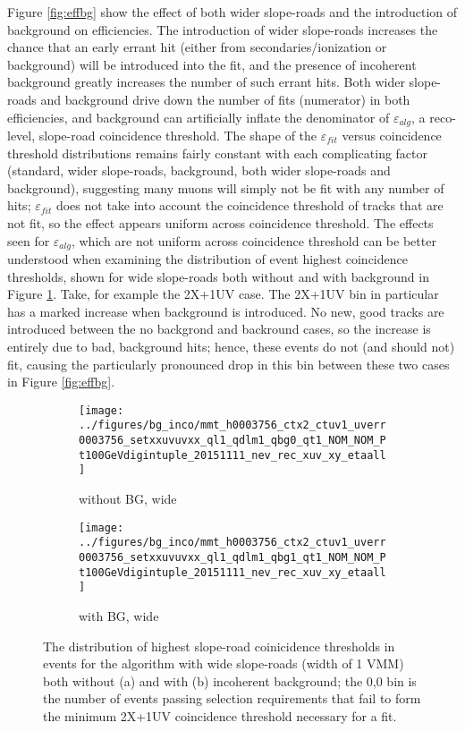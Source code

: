 Figure \ref{fig:effbg} show the effect of both wider slope-roads and the introduction of background on efficiencies.  The introduction of wider slope-roads increases the chance that an early errant hit (either from secondaries/ionization or background) will be introduced into the fit, and the presence of incoherent background greatly increases the number of such errant hits.  Both wider slope-roads and background drive down the number of fits (numerator) in both efficiencies, and background can artificially inflate the denominator of $\varepsilon_{alg}$, a reco-level, slope-road coincidence threshold.  The shape of the $\varepsilon_{fit}$ versus coincidence threshold distributions remains fairly constant with each complicating factor (standard, wider slope-roads, background, both wider slope-roads and background), suggesting many muons will simply not be fit with any number of hits; $\varepsilon_{fit}$ does not take into account the coincidence threshold of tracks that are not fit, so the effect appears uniform across coincidence threshold.  The effects seen for $\varepsilon_{alg}$, which are not uniform across coincidence threshold can be better understood when examining the distribution of event highest coincidence thresholds, shown for wide slope-roads both without and with background in Figure \ref{fig:ctrecobgwide}.  Take, for example the 2X+1UV case.  The 2X+1UV bin in particular has a marked increase when background is introduced.  No new, good tracks are introduced between the no backgrond and backround cases, so the increase is entirely due to bad, background hits; hence, these events do not (and should not) fit, causing the particularly pronounced drop in this bin between these two cases in Figure \ref{fig:effbg}.

\begin{figure}[!htbp]\captionsetup{justification=centering}
  \centering
  \begin{subfigure}{0.450\textwidth}\caption{without BG, wide}\texttt{[image: ../figures/bg\_inco/mmt\_h0003756\_ctx2\_ctuv1\_uverr0003756\_setxxuvuvxx\_ql1\_qdlm1\_qbg0\_qt1\_NOM\_NOM\_Pt100GeVdigintuple\_20151111\_nev\_rec\_xuv\_xy\_etaall]}\end{subfigure}
    \begin{subfigure}{0.450\textwidth}\caption{with BG, wide}\texttt{[image: ../figures/bg\_inco/mmt\_h0003756\_ctx2\_ctuv1\_uverr0003756\_setxxuvuvxx\_ql1\_qdlm1\_qbg1\_qt1\_NOM\_NOM\_Pt100GeVdigintuple\_20151111\_nev\_rec\_xuv\_xy\_etaall]}\end{subfigure}
  \caption{\label{fig:ctrecobgwide} The distribution of highest slope-road coinicidence thresholds in events for the algorithm with wide slope-roads (width of 1 VMM) both without (a) and with (b) incoherent background; the 0,0 bin is the number of events passing selection requirements that fail to form the minimum 2X+1UV coincidence threshold necessary for a fit.}
\end{figure}


